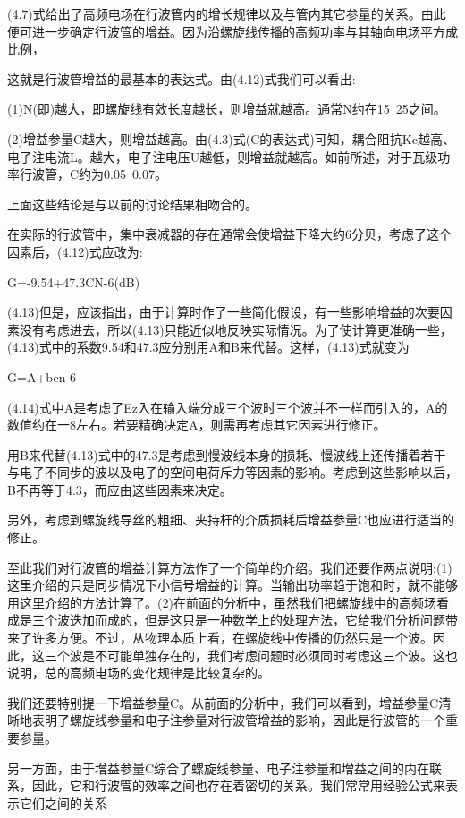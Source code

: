 (4.7)式给出了高频电场在行波管内的增长规律以及与管内其它参量的关系。由此便可进一步确定行波管的增益。因为沿螺旋线传播的高频功率与其轴向电场平方成比例，



这就是行波管增益的最基本的表达式。由(4.12)式我们可以看出:


(1)N(即)越大，即螺旋线有效长度越长，则增益就越高。通常N约在15~25之间。


(2)增益参量C越大，则增益越高。由(4.3)式(C的表达式)可知，耦合阻抗Kc越高、电子注电流L。越大，电子注电压U越低，则增益就越高。如前所述，对于瓦级功率行波管，C约为0.05~0.07。


上面这些结论是与以前的讨论结果相吻合的。


在实际的行波管中，集中衰减器的存在通常会使增益下降大约6分贝，考虑了这个因素后，(4.12)式应改为:


G=-9.54+47.3CN-6(dB)


(4.13)但是，应该指出，由于计算时作了一些简化假设，有一些影响增益的次要因素没有考虑进去，所以(4.13)只能近似地反映实际情况。为了使计算更准确一些，(4.13)式中的系数9.54和47.3应分别用A和B来代替。这样，(4.13)式就变为


G=A+bcn-6


(4.14)式中A是考虑了Ez入在输入端分成三个波时三个波并不一样而引入的，A的数值约在一8左右。若要精确决定A，则需再考虑其它因素进行修正。


用B来代替(4.13)式中的47.3是考虑到慢波线本身的损耗、慢波线上还传播着若干与电子不同步的波以及电子的空间电荷斥力等因素的影响。考虑到这些影响以后，B不再等于4.3，而应由这些因素来决定。


另外，考虑到螺旋线导丝的粗细、夹持杆的介质损耗后增益参量C也应进行适当的修正。


至此我们对行波管的增益计算方法作了一个简单的介绍。我们还要作两点说明:(1)这里介绍的只是同步情况下小信号增益的计算。当输出功率趋于饱和时，就不能够用这里介绍的方法计算了。(2)在前面的分析中，虽然我们把螺旋线中的高频场看成是三个波迭加而成的，但是这只是一种数学上的处理方法，它给我们分析问题带来了许多方便。不过，从物理本质上看，在螺旋线中传播的仍然只是一个波。因此，这三个波是不可能单独存在的，我们考虑问题时必须同时考虑这三个波。这也说明，总的高频电场的变化规律是比较复杂的。


我们还要特别提一下增益参量C。从前面的分析中，我们可以看到，增益参量C清晰地表明了螺旋线参量和电子注参量对行波管增益的影响，因此是行波管的一个重要参量。


另一方面，由于增益参量C综合了螺旋线参量、电子注参量和增益之间的内在联系，因此，它和行波管的效率之间也存在着密切的关系。我们常常用经验公式来表示它们之间的关系


